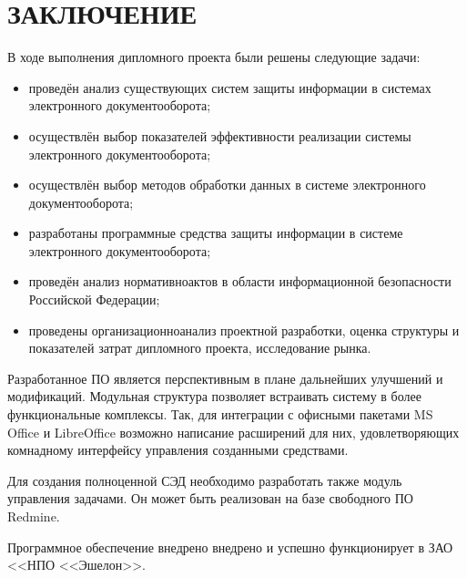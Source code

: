 \chapter*{ЗАКЛЮЧЕНИЕ}						%

В ходе выполнения дипломного проекта были решены следующие задачи:
\begin{itemize}
	\item проведён анализ существующих систем защиты информации в системах электронного документооборота;
	\item осуществлён выбор показателей эффективности реализации системы электронного документооборота;
	\item осуществлён выбор методов обработки данных в системе электронного документооборота;
	\item разработаны программные средства защиты информации в системе электронного документооборота;
	\item проведён анализ нормативно актов в области информационной безопасности Российской Федерации;
	\item проведены организационно анализ проектной разработки, оценка структуры и показателей затрат дипломного проекта, исследование рынка.
\end{itemize}

\vspace{\baselineskip}
Разработанное ПО является перспективным в плане дальнейших улучшений и модификаций. Модульная структура позволяет встраивать систему в более функциональные комплексы. Так, для интеграции с офисными пакетами MS Office и LibreOffice возможно написание расширений для них, удовлетворяющих комнадному интерфейсу управления созданными средствами.

Для создания полноценной СЭД необходимо разработать также модуль управления задачами. Он может быть реализован на базе свободного ПО Redmine.

\vspace{\baselineskip}
Программное обеспечение внедрено внедрено и успешно функционирует в ЗАО <<НПО <<Эшелон>>.

\clearpage